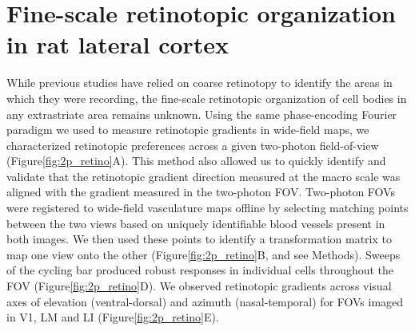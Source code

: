 \section{Fine-scale retinotopic organization in rat lateral cortex}
While previous studies have relied on coarse retinotopy to identify the areas in which they were recording, the fine-scale retinotopic organization of cell bodies in any extrastriate area remains unknown. Using the same phase-encoding Fourier paradigm we used to measure retinotopic gradients in wide-field maps, we characterized retinotopic preferences across a given two-photon field-of-view (Figure\ref{fig:2p_retino}A). This method also allowed us to quickly identify and validate that the retinotopic gradient direction measured at the macro scale was aligned with the gradient measured in the two-photon FOV. Two-photon FOVs were registered to wide-field vasculature maps offline by selecting matching points between the two views based on uniquely identifiable blood vessels present in both images. We then used these points to identify a transformation matrix to map one view onto the other (Figure\ref{fig:2p_retino}B, and see Methods). Sweeps of the cycling bar produced robust responses in individual cells throughout the FOV (Figure\ref{fig:2p_retino}D). We observed retinotopic gradients across visual axes of elevation (ventral-dorsal) and azimuth (nasal-temporal) for FOVs imaged in V1, LM and LI (Figure\ref{fig:2p_retino}E). 

